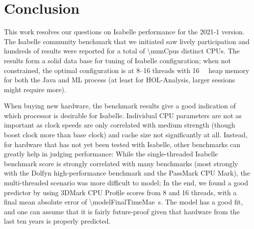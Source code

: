 \section{Conclusion}\label{sec:conclusion}
This work resolves our questions on Isabelle performance for the 2021-1 version.
The Isabelle community benchmark that we initiated saw lively participation
and hundreds of results were reported for a total of \num{\numCpus} distinct CPUs.
The results form a solid data base for tuning of Isabelle configuration;
when not constrained, the optimal configuration is at \numrange{8}{16} threads with \SI{16}{\giga\byte} heap memory for both the Java and ML process
(at least for HOL-Analysis, larger sessions might require more).

When buying new hardware,
the benchmark results give a good indication of which processor is desirable for Isabelle.
Individual CPU parameters are not as important
as clock speeds are only correlated with medium strength (though boost clock more than base clock)
and cache size not significantly at all.
Instead, for hardware that has not yet been tested with Isabelle,
other benchmarks can greatly help in judging performance:
While the single-threaded Isabelle benchmark score is strongly correlated with many benchmarks
(most strongly with the Dolfyn high-performance benchmark and the PassMark CPU Mark),
the multi-threaded scenario was more difficult to model;
In the end, we found a good predictor by using 3DMark CPU Profile scores from \num{8} and \num{16} threads,
with a final mean absolute error of \SI[round-mode=places,round-precision=2]{\modelFinalTimeMae}{\second}.
The model has a good fit, and one can assume that it is fairly future-proof given that hardware from the last ten years is properly predicted.
